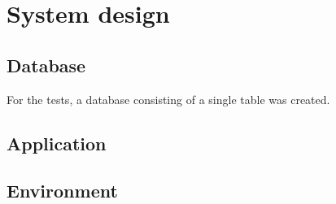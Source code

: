 
\chapter{System design}

\section{Database}

For the tests, a database consisting of a single table was created. 

\section{Application}
\section{Environment}

